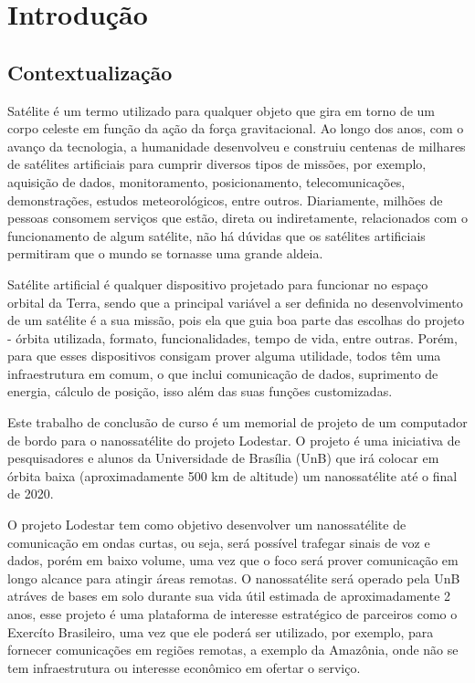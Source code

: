 \chapter{Introdução} \label{introducao}
\section{Contextualização}
Satélite é um termo utilizado para qualquer objeto que gira em torno de um corpo celeste em função da ação da força gravitacional. Ao longo dos anos, com o avanço da tecnologia, a humanidade desenvolveu e construiu centenas de milhares de satélites artificiais para cumprir diversos tipos de missões, por exemplo, aquisição de dados, monitoramento, posicionamento, telecomunicações, demonstrações, estudos meteorológicos, entre outros. Diariamente, milhões de pessoas consomem serviços que estão, direta ou indiretamente, relacionados com o funcionamento de algum satélite, não há dúvidas que os satélites artificiais permitiram que o mundo se tornasse uma grande aldeia.

Satélite artificial é qualquer dispositivo projetado para funcionar no espaço orbital da Terra, sendo que a principal variável a ser definida no desenvolvimento de um satélite é a sua missão, pois ela que guia boa parte das escolhas do projeto - órbita utilizada, formato, funcionalidades, tempo de vida, entre outras. Porém, para que esses dispositivos consigam prover alguma utilidade, todos têm uma infraestrutura em comum, o que inclui comunicação de dados, suprimento de energia, cálculo de posição, isso além das suas funções customizadas.\cite{nasa_comms_article} 

Este trabalho de conclusão de curso é um memorial de projeto de um computador de bordo para o nanossatélite do projeto Lodestar. O projeto é uma iniciativa de pesquisadores e alunos da Universidade de Brasília (UnB) que irá colocar em órbita baixa (aproximadamente 500 km de altitude) um nanossatélite até o final de 2020.

O projeto Lodestar tem como objetivo desenvolver um nanossatélite de comunicação em ondas curtas, ou seja, será possível trafegar sinais de voz e dados, porém em baixo volume, uma vez que o foco será prover comunicação em longo alcance para atingir áreas remotas. O nanossatélite será operado pela UnB atráves de bases em solo durante sua vida útil estimada de aproximadamente 2 anos, esse projeto é uma plataforma de interesse estratégico de parceiros como o Exercíto Brasileiro, uma vez que ele poderá ser utilizado, por exemplo, para fornecer comunicações em regiões remotas, a exemplo da Amazônia, onde não se tem infraestrutura ou interesse econômico em ofertar o serviço. 

